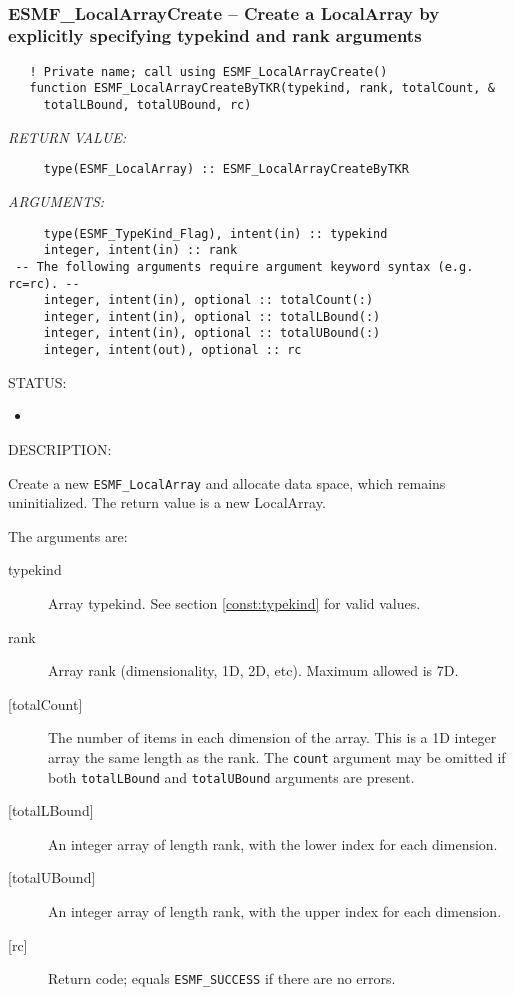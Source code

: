  
\mbox{}\hrulefill\ 
 
\subsubsection [ESMF\_LocalArrayCreate] {ESMF\_LocalArrayCreate -- Create a LocalArray by explicitly specifying typekind and rank arguments}


\begin{verbatim}   ! Private name; call using ESMF_LocalArrayCreate()
   function ESMF_LocalArrayCreateByTKR(typekind, rank, totalCount, &
     totalLBound, totalUBound, rc)\end{verbatim}{\em RETURN VALUE:}
\begin{verbatim}     type(ESMF_LocalArray) :: ESMF_LocalArrayCreateByTKR\end{verbatim}{\em ARGUMENTS:}
\begin{verbatim}     type(ESMF_TypeKind_Flag), intent(in) :: typekind
     integer, intent(in) :: rank
 -- The following arguments require argument keyword syntax (e.g. rc=rc). --
     integer, intent(in), optional :: totalCount(:)
     integer, intent(in), optional :: totalLBound(:)
     integer, intent(in), optional :: totalUBound(:)
     integer, intent(out), optional :: rc\end{verbatim}
{\sf STATUS:}
   \begin{itemize}
   \item{}
   \end{itemize}
  
{\sf DESCRIPTION:\\ }


   Create a new {\tt ESMF\_LocalArray} and allocate data space, which remains
   uninitialized. The return value is a new LocalArray.
  
   The arguments are:
   \begin{description}
   \item[typekind]
   Array typekind. See section \ref{const:typekind} for valid values.
   \item[rank]
   Array rank (dimensionality, 1D, 2D, etc). Maximum allowed is 7D.
   \item[{[totalCount]}]
   The number of items in each dimension of the array. This is a 1D
   integer array the same length as the rank. The {\tt count} argument may
   be omitted if both {\tt totalLBound} and {\tt totalUBound} arguments are present.
   \item[{[totalLBound]}]
   An integer array of length rank, with the lower index for each dimension.
   \item[{[totalUBound]}]
   An integer array of length rank, with the upper index for each dimension.
   \item[{[rc]}]
   Return code; equals {\tt ESMF\_SUCCESS} if there are no errors.
   \end{description}
   
